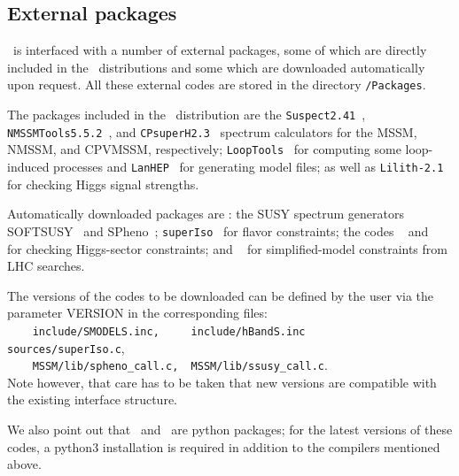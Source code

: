 \documentclass[12pt,a4paper]{article}
\begin{document}
\subsection{External packages}

\micro\ is interfaced with a number of external packages, some of which are directly included in the \micro\ distributions and some which are downloaded automatically upon request. All these external codes are stored in the directory {\tt /Packages}.
 
The packages included in the \micro\ distribution are 
the {\tt Suspect2.41}~\cite{Djouadi:2002ze},  {\tt NMSSMTools5.5.2}~\cite{nmssmtools,Ellwanger:2005dv}, and {\tt CPsuperH2.3}~\cite{CPSUPERH,Lee:2003nta} spectrum calculators for the 
MSSM, NMSSM, and CPVMSSM, respectively; {\tt LoopTools}~\cite{Hahn:1998yk} for computing some loop-induced processes 
and {\tt LanHEP}~\cite{Semenov:2014rea} for generating model files; as well as 
 {\tt Lilith-2.1}~\cite{Bernon:2015hsa,Kraml:2019sis,Bertrand:2020lyb} for checking Higgs signal strengths. 

 
Automatically downloaded packages are : 
the SUSY spectrum generators SOFTSUSY~\cite{Allanach:2001kg} and SPheno~\cite{Porod:2011nf}; 
{\tt superIso}~\cite{Mahmoudi:2008tp} for flavor constraints; 
the codes \HB~\cite{Bechtle:2013wla,Bechtle:2020pkv} and \HS~\cite{Bechtle:2013xfa,Bechtle:2020uwn} for checking Higgs-sector constraints; and 
\smodels~\cite{Kraml:2013mwa,Ambrogi:2017neo,Ambrogi:2018ujg,smodels20} for simplified-model constraints from LHC searches. 
 
The versions of the codes to be downloaded can be defined by the user  via the parameter
VERSION  in the corresponding files:\\[2mm]
 \verb|    include/SMODELS.inc,     include/hBandS.inc     sources/superIso.c|,\\
 \verb|    MSSM/lib/spheno_call.c,  MSSM/lib/ssusy_call.c|.\\[2mm]
Note however, that care has to be taken that new versions are compatible with the existing interface structure.

We also point out that \lilith\ and \smodels\ are python packages; for the latest versions of these codes, a
python3 installation is required in addition to the compilers mentioned above.

\end{document}
